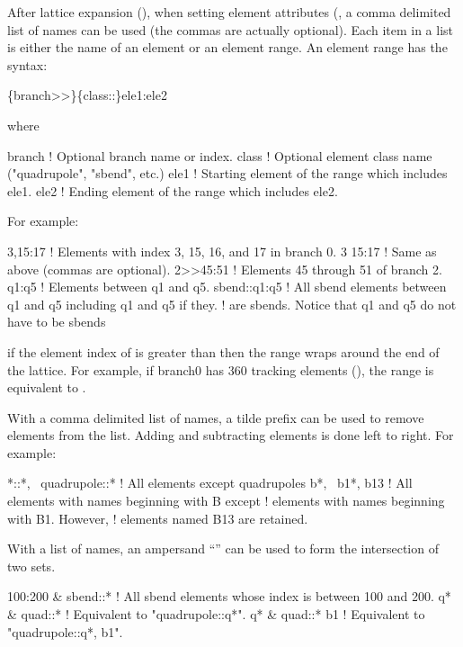 {{{{{After lattice expansion (), when setting element attributes (, a
comma delimited list of names can be used (the commas are actually optional). Each item in a list is
either the name of an element or an element range. An element range has the syntax:
\begin{example}
  \{branch>>\}\{class::\}ele1:ele2
\end{example}
where
\begin{example}
  branch   ! Optional branch name or index.
  class    ! Optional element class name ("quadrupole", "sbend", etc.)
  ele1     ! Starting element of the range which includes ele1.
  ele2     ! Ending element of the range which includes ele2. 
\end{example}
For example:
\begin{example}
  3,15:17          ! Elements with index 3, 15, 16, and 17 in branch 0.
  3 15:17          ! Same as above (commas are optional).
  2>>45:51         ! Elements 45 through 51 of branch 2.
  q1:q5            ! Elements between q1 and q5.
  sbend::q1:q5     ! All sbend elements between q1 and q5 including q1 and q5 if they. 
                   ! are sbends. Notice that q1 and q5 do not have to be sbends
\end{example}
if the element index of  is greater than  then the range wraps around the end of
the lattice. For example, if branch0 has 360 tracking elements (), the range
 is equivalent to .

With a comma delimited list of names, a tilde prefix can be used to remove elements from the list.
Adding and subtracting elements is done left to right. For example:
\begin{example}
  *::*, ~quadrupole::*  ! All elements except quadrupoles
  b*, ~b1*, b13         ! All elements with names beginning with B except
                        !   elements with names beginning with B1. However,
                        !   elements named B13 are retained.
\end{example}

With a list of names, an ampersand ``\vn{\&}'' can be used to form the intersection of two sets.
\begin{example}
  100:200 \& sbend::*    ! All sbend elements whose index is between 100 and 200.
  q* \& quad::*          ! Equivalent to "quadrupole::q*".
  q* \& quad::* b1       ! Equivalent to "quadrupole::q*, b1".
\end{example}

}}}}}
